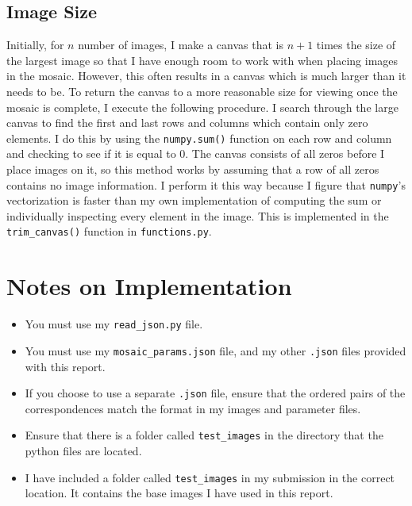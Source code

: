 \documentclass[]{article}
\begin{document}
	
	
	\subsection{Image Size}
	Initially, for $n$ number of images, I make a canvas that is $n+1$ times the size of the largest image so that I have enough room to work with when placing images in the mosaic. However, this often results in a canvas which is much larger than it needs to be. To return the canvas to a more reasonable size for viewing once the mosaic is complete, I execute the following procedure. I search through the large canvas to find the first and last rows and columns which contain only zero elements. I do this by using the \texttt{numpy.sum()} function on each row and column and checking to see if it is equal to 0. The canvas consists of all zeros before I place images on it, so this method works by assuming that a row of all zeros contains no image information. I perform it this way because I figure that \texttt{numpy}'s vectorization is faster than my own implementation of computing the sum or individually inspecting every element in the image. This is implemented in the \texttt{trim\_canvas()} function in \texttt{functions.py}.
	
	\newpage
	
\section{Notes on Implementation}
	\begin{itemize}
	\item You must use my \texttt{read\_json.py} file.
	\item You must use my \texttt{mosaic\_params.json} file, and my other \texttt{.json} files provided with this report. 
	\item If you choose to use a separate \texttt{.json} file, ensure that the ordered pairs of the correspondences match the format in my images and parameter files.
	\item Ensure that there is a folder called \texttt{test\_images} in the directory that the python files are located.
	\item I have included a folder called \texttt{test\_images} in my submission in the correct location. It contains the base images I have used in this report. 
	
\end{itemize}
\end{document}
